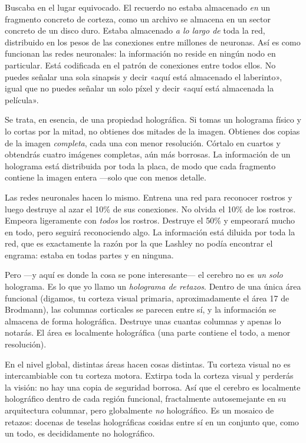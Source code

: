 \documentclass[11pt, twoside, openright]{book}
\begin{document}
Buscaba en el lugar equivocado. El recuerdo no estaba almacenado \textit{en} un fragmento concreto de corteza, como un archivo se almacena en un sector concreto de un disco duro. Estaba almacenado \textit{a lo largo de} toda la red, distribuido en los pesos de las conexiones entre millones de neuronas. Así es como funcionan las redes neuronales: la información no reside en ningún nodo en particular. Está codificada en el patrón de conexiones entre todos ellos. No puedes señalar una sola sinapsis y decir «aquí está almacenado el laberinto», igual que no puedes señalar un solo píxel y decir «aquí está almacenada la película».

Se trata, en esencia, de una propiedad holográfica. Si tomas un holograma físico y lo cortas por la mitad, no obtienes dos mitades de la imagen. Obtienes dos copias de la imagen \textit{completa}, cada una con menor resolución. Córtalo en cuartos y obtendrás cuatro imágenes completas, aún más borrosas. La información de un holograma está distribuida por toda la placa, de modo que cada fragmento contiene la imagen entera ---solo que con menos detalle.

Las redes neuronales hacen lo mismo. Entrena una red para reconocer rostros y luego destruye al azar el 10\% de sus conexiones. No olvida el 10\% de los rostros. Empeora ligeramente con \textit{todos} los rostros. Destruye el 50\% y empeorará mucho en todo, pero seguirá reconociendo algo. La información está diluida por toda la red, que es exactamente la razón por la que Lashley no podía encontrar el engrama: estaba en todas partes y en ninguna.

Pero ---y aquí es donde la cosa se pone interesante--- el cerebro no es \textit{un solo} holograma. Es lo que yo llamo un \textit{holograma de retazos}. Dentro de una única área funcional (digamos, tu corteza visual primaria, aproximadamente el área 17 de Brodmann), las columnas corticales se parecen entre sí, y la información se almacena de forma holográfica. Destruye unas cuantas columnas y apenas lo notarás. El área es localmente holográfica (una parte contiene el todo, a menor resolución).

En el nivel global, distintas áreas hacen cosas distintas. Tu corteza visual no es intercambiable con tu corteza motora. Extirpa toda la corteza visual y perderás la visión: no hay una copia de seguridad borrosa. Así que el cerebro es localmente holográfico dentro de cada región funcional, fractalmente autosemejante en su arquitectura columnar, pero globalmente \textit{no} holográfico. Es un mosaico de retazos: docenas de teselas holográficas cosidas entre sí en un conjunto que, como un todo, es decididamente no holográfico.
\end{document}
